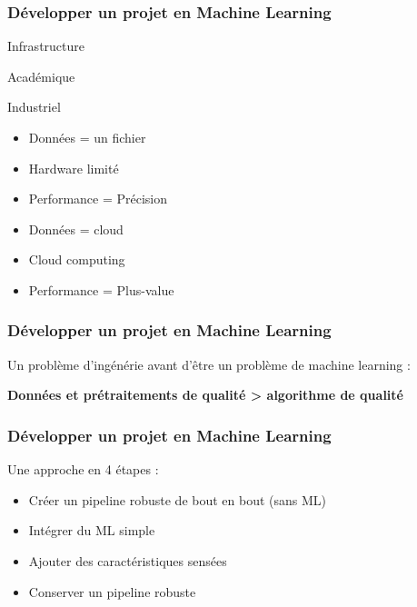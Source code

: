 \documentclass{formation}
\begin{document}
\begin{frame}
  \frametitle{Développer un projet en Machine Learning}
  \begin{center}
    Infrastructure
  \end{center}
  \begin{minipage}[c]{0.49\linewidth}
    \begin{center}
      Académique
      \newline
    \end{center}
  \end{minipage}\hfill
  \begin{minipage}[c]{0.49\linewidth}
    \begin{center}
      Industriel
      \newline
    \end{center}
  \end{minipage}\hfill
  \begin{minipage}[c]{0.49\linewidth}
    \begin{itemize}
    \item Données = un fichier
    \item Hardware limité
    \item Performance = Précision
    \end{itemize}
  \end{minipage}\hfill
  \vrule{}
  \begin{minipage}[c]{0.49\linewidth}
    \begin{itemize}
    \item Données = cloud
    \item Cloud computing
    \item Performance = Plus-value
    \end{itemize}
  \end{minipage}\hfill
\end{frame}

\begin{frame}
  \frametitle{Développer un projet en Machine Learning}
  Un problème d'ingénérie avant d'être un problème de machine learning : \\
  \begin{center}
    \textbf{Données et prétraitements de qualité > algorithme de qualité}
  \end{center}
\end{frame}

\begin{frame}
  \frametitle{Développer un projet en Machine Learning}
  Une approche en 4 étapes :
  \begin{itemize}
  \item Créer un pipeline robuste de bout en bout (sans ML)
  \item Intégrer du ML simple
  \item Ajouter des caractéristiques sensées
  \item Conserver un pipeline robuste
  \end{itemize}
\end{frame}
\end{document}
